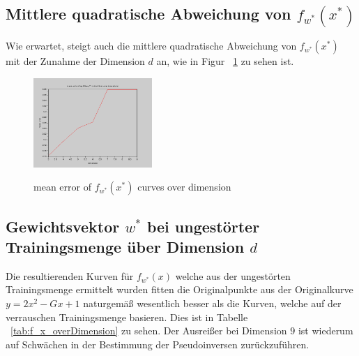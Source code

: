 \documentclass[]{report}
\begin{document}
\subsection{Mittlere quadratische Abweichung von $f_{w^*}(x^*)$}

Wie erwartet, steigt auch die mittlere quadratische Abweichung von $f_{w^*}(x^*)$ mit der Zunahme der Dimension $d$ an, wie in Figur ~\ref{tab:MeanError} zu sehen ist.

\begin{figure}[h]
\centering
\includegraphics[width=0.4\textwidth]{./images/MeanErrorOverDimensions.png} \\
\caption{mean error of $f_{w^*}(x^*)$ curves over dimension}
\label{tab:MeanError}
\end{figure}

\subsection{Gewichtsvektor $w^*$ bei ungest\"orter Trainingsmenge \"uber Dimension $d$}

Die resultierenden Kurven f\"ur $f_{w^*}(x)$ welche aus der ungest\"orten Trainingsmenge ermittelt wurden fitten die Originalpunkte aus der Originalkurve $y = 2x^2-Gx+1$ naturgem\"a{\ss} wesentlich besser als die Kurven, welche auf der verrauschen Trainingsmenge basieren. Dies ist in Tabelle ~\ref{tab:f_x_overDimension} zu sehen. Der Ausrei{\ss}er bei Dimension $9$ ist wiederum auf Schw\"achen in der Bestimmung der Pseudoinversen zur\"uckzuf\"uhren.
\end{document}
